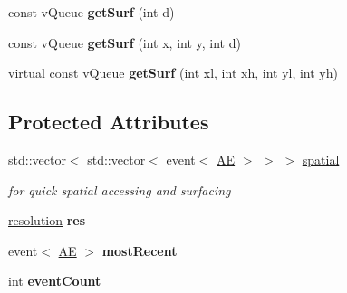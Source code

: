 \begin{DoxyCompactItemize}
\item 
const v\+Queue {\bfseries get\+Surf} (int d)\hypertarget{classev_1_1vSurface_a2beddf5b5ffdbe12c1592ef8c1c742ab}{}\label{classev_1_1vSurface_a2beddf5b5ffdbe12c1592ef8c1c742ab}

\item 
const v\+Queue {\bfseries get\+Surf} (int x, int y, int d)\hypertarget{classev_1_1vSurface_af6565b2434916ebc73820fb870e6f9a9}{}\label{classev_1_1vSurface_af6565b2434916ebc73820fb870e6f9a9}

\item 
virtual const v\+Queue {\bfseries get\+Surf} (int xl, int xh, int yl, int yh)\hypertarget{classev_1_1vSurface_ae27682a1a876ef2c3b8c37c63c5a531c}{}\label{classev_1_1vSurface_ae27682a1a876ef2c3b8c37c63c5a531c}

\end{DoxyCompactItemize}
\subsection*{Protected Attributes}
\begin{DoxyCompactItemize}
\item 
std\+::vector$<$ std\+::vector$<$ event$<$ \hyperlink{classev_1_1AddressEvent}{AE} $>$ $>$ $>$ \hyperlink{classev_1_1vSurface_a157b4d26be73a1de42b0a043f12cf984}{spatial}\hypertarget{classev_1_1vSurface_a157b4d26be73a1de42b0a043f12cf984}{}\label{classev_1_1vSurface_a157b4d26be73a1de42b0a043f12cf984}

\begin{DoxyCompactList}\small\item\em for quick spatial accessing and surfacing \end{DoxyCompactList}\item 
\hyperlink{structev_1_1resolution}{resolution} {\bfseries res}\hypertarget{classev_1_1vSurface_a7ba9be674dbe03302b56306b987cff62}{}\label{classev_1_1vSurface_a7ba9be674dbe03302b56306b987cff62}

\item 
event$<$ \hyperlink{classev_1_1AddressEvent}{AE} $>$ {\bfseries most\+Recent}\hypertarget{classev_1_1vSurface_a64339e84abccbb0099e0236fa4339647}{}\label{classev_1_1vSurface_a64339e84abccbb0099e0236fa4339647}

\item 
int {\bfseries event\+Count}\hypertarget{classev_1_1vSurface_a2b6a8d84a626b8dce15597807da598fb}{}\label{classev_1_1vSurface_a2b6a8d84a626b8dce15597807da598fb}

\end{DoxyCompactItemize}


